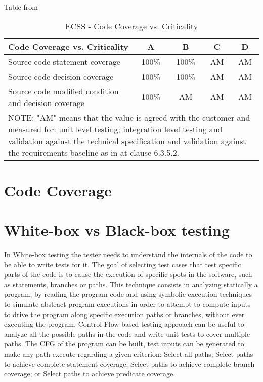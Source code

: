 {Table from \cite{ecss-q-st-40c}
\begin{table}[!ht]
\centering
\noindent \begin{tabular}{|m{6cm}|c|c|c|c|}
\hline
\textbf{Code Coverage vs. Criticality} & A & B & C & D \\\hline
Source code statement coverage & 100\% & 100\% & AM & AM \\\hline
Source code decision coverage & 100\% & 100\% & AM & AM \\\hline
Source code modified condition and decision coverage & 100\% & AM & AM & AM \\\hline
\multicolumn{5}{|m{14cm}|}{
NOTE: "AM" means that the value is agreed with the customer and measured for:
unit level testing; integration level testing and validation against the
technical specification and validation against the requirements baseline
as in \cite{ecss-q-st-80c} at clause 6.3.5.2.
}\\\hline
\end{tabular}
\caption{\protect\ac{ECSS} - Code Coverage vs. Criticality}\label{tab:ccoverage}
\end{table}

\section{Code Coverage}
}
\section{White-box vs Black-box testing}
In White-box testing the tester needs to understand the internals of
the code to be able to write tests for it.
The goal of selecting test cases that test specific parts of the code
is to cause the execution of specific spots in the software, such as
statements, branches or
paths.
This technique consists in analyzing statically a program, by reading
the program code and using symbolic execution techniques to simulate
abstract program
executions in order to attempt to compute inputs to drive the program
along specific execution paths or branches, without ever executing the
program. Control Flow based testing approach can be useful to analyze all the
possible paths in the code and write unit tests to cover multiple paths.
The \ac{CFG} of the program can be built,
test inputs can be generated to make any path execute regarding a given criterion:
Select all paths;
Select paths to achieve complete statement
coverage\cite{stt,Ntafos:1988:CST:630792.631017};
Select paths to achieve complete branch coverage\cite{Roper1994,stt};
or Select paths to achieve predicate
coverage\cite{stt,Ntafos:1988:CST:630792.631017}.

